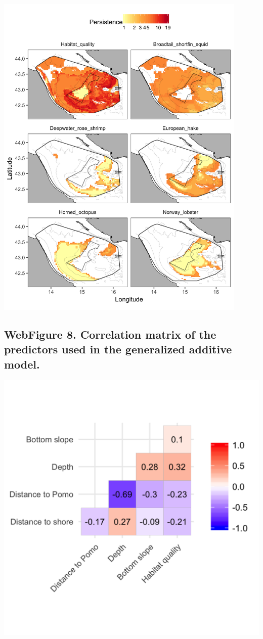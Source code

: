 \documentclass[11pt,]{article}
\begin{document}
\includegraphics[width=0.90000\textwidth]{../ms_1/ms_1_figs/map_nurseries.png}

\newpage

\subsection{WebFigure 8. Correlation matrix of the predictors used in
the generalized additive
model.}\label{webfigure-8.-correlation-matrix-of-the-predictors-used-in-the-generalized-additive-model.}

\includegraphics[width=1.00000\textwidth]{../ms_1/ms_1_figs/plot_corr_matrix.png}
\end{document}
